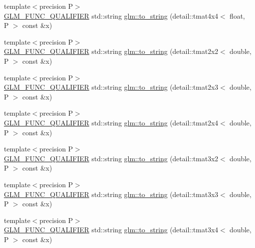 \begin{DoxyCompactItemize}
\item 
{\footnotesize template$<$precision P$>$ }\\\hyperlink{setup_8hpp_a33fdea6f91c5f834105f7415e2a64407}{G\+L\+M\+\_\+\+F\+U\+N\+C\+\_\+\+Q\+U\+A\+L\+I\+F\+I\+ER} std\+::string \hyperlink{namespaceglm_a8603079aa7490861bd0d069fb9539ea4}{glm\+::to\+\_\+string} (detail\+::tmat4x4$<$ float, P $>$ const \&x)
\item 
{\footnotesize template$<$precision P$>$ }\\\hyperlink{setup_8hpp_a33fdea6f91c5f834105f7415e2a64407}{G\+L\+M\+\_\+\+F\+U\+N\+C\+\_\+\+Q\+U\+A\+L\+I\+F\+I\+ER} std\+::string \hyperlink{namespaceglm_a7d97d16b88df8cabe0fd352a3f7cbc67}{glm\+::to\+\_\+string} (detail\+::tmat2x2$<$ double, P $>$ const \&x)
\item 
{\footnotesize template$<$precision P$>$ }\\\hyperlink{setup_8hpp_a33fdea6f91c5f834105f7415e2a64407}{G\+L\+M\+\_\+\+F\+U\+N\+C\+\_\+\+Q\+U\+A\+L\+I\+F\+I\+ER} std\+::string \hyperlink{namespaceglm_a7d107a659954f00ea723ce93beef4d3f}{glm\+::to\+\_\+string} (detail\+::tmat2x3$<$ double, P $>$ const \&x)
\item 
{\footnotesize template$<$precision P$>$ }\\\hyperlink{setup_8hpp_a33fdea6f91c5f834105f7415e2a64407}{G\+L\+M\+\_\+\+F\+U\+N\+C\+\_\+\+Q\+U\+A\+L\+I\+F\+I\+ER} std\+::string \hyperlink{namespaceglm_af5a211cd0d2ae100217f01efcfcc3a64}{glm\+::to\+\_\+string} (detail\+::tmat2x4$<$ double, P $>$ const \&x)
\item 
{\footnotesize template$<$precision P$>$ }\\\hyperlink{setup_8hpp_a33fdea6f91c5f834105f7415e2a64407}{G\+L\+M\+\_\+\+F\+U\+N\+C\+\_\+\+Q\+U\+A\+L\+I\+F\+I\+ER} std\+::string \hyperlink{namespaceglm_acab2e86e3e8b184152c82bde39a9da6a}{glm\+::to\+\_\+string} (detail\+::tmat3x2$<$ double, P $>$ const \&x)
\item 
{\footnotesize template$<$precision P$>$ }\\\hyperlink{setup_8hpp_a33fdea6f91c5f834105f7415e2a64407}{G\+L\+M\+\_\+\+F\+U\+N\+C\+\_\+\+Q\+U\+A\+L\+I\+F\+I\+ER} std\+::string \hyperlink{namespaceglm_a86b22d004f70933e0e8c7c524ce203bb}{glm\+::to\+\_\+string} (detail\+::tmat3x3$<$ double, P $>$ const \&x)
\item 
{\footnotesize template$<$precision P$>$ }\\\hyperlink{setup_8hpp_a33fdea6f91c5f834105f7415e2a64407}{G\+L\+M\+\_\+\+F\+U\+N\+C\+\_\+\+Q\+U\+A\+L\+I\+F\+I\+ER} std\+::string \hyperlink{namespaceglm_a6ca2fcca704c9d5d4038cc6c2963b5f7}{glm\+::to\+\_\+string} (detail\+::tmat3x4$<$ double, P $>$ const \&x)

\end{DoxyCompactItemize}
